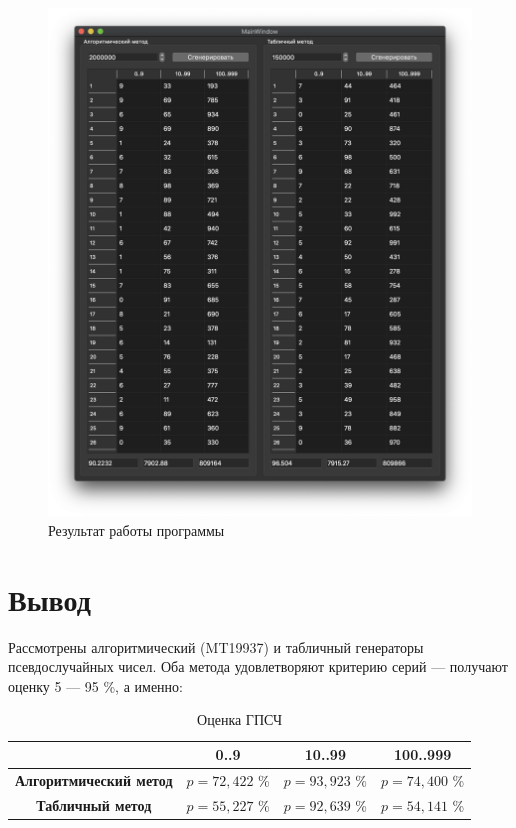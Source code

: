 \documentclass[a4paper,oneside,12pt]{extreport}
\begin{document}
\begin{figure}[H]
	\centering
	\includegraphics[width=0.99\linewidth]{inc/img/result.png}
	\caption{Результат работы программы}
	\label{img:result}
\end{figure}

\chapter*{Вывод}

Рассмотрены алгоритмический (MT19937) и табличный генераторы псевдослучайных чисел.
Оба метода удовлетворяют критерию серий — получают оценку 5 — 95 \%, а именно:

\begin{table}[H]
	\centering
	\caption{Оценка ГПСЧ}
	\begin{tabular}{|c|c|c|c|}
		\hline
		                               & \textbf{0..9}   & \textbf{10..99} & \textbf{100..999} \\ \hline
		\textbf{Алгоритмический метод} & $p = 72,422$ \% & $p = 93,923$ \% & $p = 74,400$ \%   \\ \hline
		\textbf{Табличный метод}       & $p = 55,227$ \% & $p = 92,639$ \% & $p = 54,141$ \%   \\ \hline
	\end{tabular}
\end{table}
\end{document}
